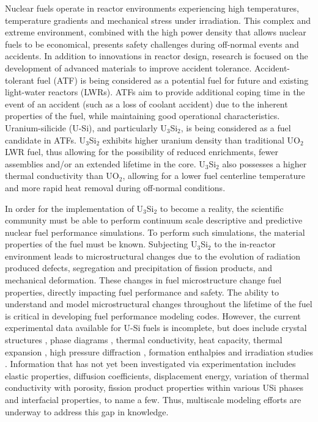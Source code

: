 \documentclass[review]{elsarticle}
\begin{document}
Nuclear fuels operate in reactor environments experiencing high temperatures, temperature gradients and mechanical stress under irradiation.  This complex and extreme environment, combined with the high power density that allows nuclear fuels to be economical, presents safety challenges during off-normal events and accidents.  In addition to innovations in reactor design, research is focused on the development of advanced materials \cite{zinkle2016} to improve accident tolerance.  Accident-tolerant fuel (ATF) \cite{zinkle2014} is being considered as a potential fuel for future and existing light-water reactors (LWRs).  ATFs aim to provide additional coping time in the event of an accident (such as a loss of coolant accident) due to the inherent properties of the fuel, while maintaining good operational characteristics.  Uranium-silicide (U-Si), and particularly U$_{3}$Si$_{2}$, is being considered as a fuel candidate in ATFs.  U$_{3}$Si$_{2}$ exhibits higher uranium density than traditional UO$_{2}$ LWR fuel, thus allowing for the possibility of reduced enrichments, fewer assemblies and/or an extended lifetime in the core.  U$_{3}$Si$_{2}$ also possesses a higher thermal conductivity than UO$_{2}$, allowing for a lower fuel centerline temperature and more rapid heat removal during off-normal conditions.  

In order for the implementation of U$_{3}$Si$_{2}$ to become a reality, the scientific community must be able to perform continuum scale descriptive and predictive nuclear fuel performance simulations.  To perform such simulations, the material properties of the fuel must be known.  Subjecting U$_{3}$Si$_{2}$ to the in-reactor environment leads to microstructural changes due to the evolution of radiation produced defects, segregation and precipitation of fission products, and mechanical deformation. These changes in fuel microstructure change fuel properties, directly impacting fuel performance and safety.  The ability to understand and model microstructural changes throughout the lifetime of the fuel is critical in developing fuel performance modeling codes.  However, the current experimental data available for U-Si fuels is incomplete, but does include crystal structures \cite{zachariasen1949, remschnig1992}, phase diagrams \cite{massalski1990}, thermal conductivity, heat capacity, thermal expansion \cite{white2015, shimizu1965}, high pressure diffraction \cite{yagoubi2013}, formation enthalpies \cite{gross1962, ohare1975, alcock1962, rand1963, berche2009} and irradiation studies \cite{shimizu1965, finlay2002}.  Information that has not yet been investigated via experimentation includes elastic properties, diffusion coefficients, displacement energy, variation of thermal conductivity with porosity, fission product properties within various USi phases and interfacial properties, to name a few.  Thus, multiscale modeling efforts are underway to address this gap in knowledge.
\end{document}
